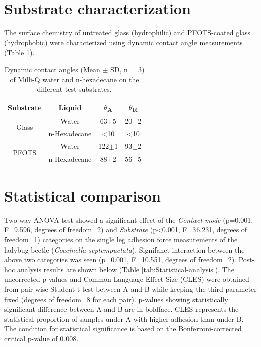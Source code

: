 \documentclass[english]{achemso}
\providecommand{\tabularnewline}{\\}
\begin{document}
\section{Substrate characterization}

The surface chemistry of untreated glass (hydrophilic) and PFOTS-coated glass (hydrophobic) were characterized using dynamic contact angle measurements (Table \ref{tab:Contact-Angles}).
\begin{table}[H]
\centering{}%
\begin{tabular}{|c|c|c|c|}
\hline 
Substrate & Liquid & \ensuremath{\theta}\textsubscript{A} & \ensuremath{\theta}\textsubscript{R}\tabularnewline
\hline 
\hline 
\multirow{2}{*}{Glass} & Water & 63\ensuremath{\pm}5\textdegree{} & 20\ensuremath{\pm}2\textdegree{}\tabularnewline
\cline{2-4} \cline{3-4} \cline{4-4} 
 & n-Hexadecane & <10\textdegree{} & <10\textdegree{}\tabularnewline
\hline 
\multirow{2}{*}{PFOTS} & Water & 122\ensuremath{\pm}1\textdegree{} & 93\ensuremath{\pm}2\textdegree{}\tabularnewline
\cline{2-4} \cline{3-4} \cline{4-4} 
 & n-Hexadecane & 88\ensuremath{\pm}2\textdegree{} & 56\ensuremath{\pm}5\textdegree{}\tabularnewline
\hline 
\end{tabular}\caption{Dynamic contact angles (Mean \ensuremath{\pm} SD, n = 3) of Milli-Q water and n-hexadecane on the different test substrates. \label{tab:Contact-Angles}}
\end{table}


\section{Statistical comparison}

Two-way ANOVA test showed a significant effect of the \emph{Contact mode} (p=0.001, F=9.596, degrees of freedom=2) 
and \emph{Substrate} (p<0.001, F=36.231, degrees of freedom=1) categories on the single leg adhesion force measurements
of the ladybug beetle (\emph{Coccinella septempuctata}). Signifanct interaction between the above two categories was seen (p=0.001, F=10.551, degrees of freedom=2). Post-hoc analysis results are shown below (Table \ref{tab:Statistical-analysis}).
The uncorrected p-values and Common Language Effect Size (CLES) were
obtained from pair-wise Student t-test between A and B while
keeping the third parameter fixed (degrees of freedom=8 for each pair). p-values showing statistically
significant difference between A and B are in boldface. 
CLES represents the statistical proportion of samples under A with higher adhesion than under B. The condition
for statistical significance is based on the Bonferroni-corrected
critical p-value of 0.008.
\end{document}
